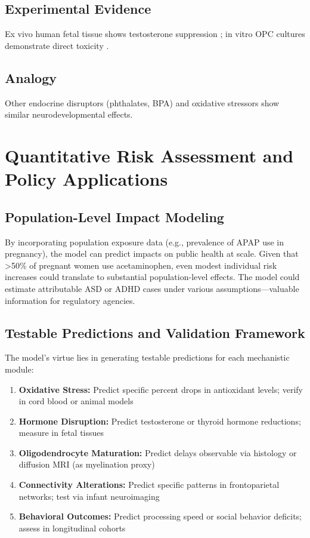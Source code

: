 \documentclass[11pt]{article}
\let\oldsection\section
\renewcommand{\section}[1]{\oldsection{#1}\setlength{\leftskip}{0em}}
\let\oldsubsection\subsection
\renewcommand{\subsection}[1]{\oldsubsection{#1}\setlength{\leftskip}{0.75em}}
\begin{document}
\subsection{Experimental Evidence}
Ex vivo human fetal tissue shows testosterone suppression \citep{kristensen2016}; in vitro OPC cultures demonstrate direct toxicity \citep{perez2012}.

\subsection{Analogy}
Other endocrine disruptors (phthalates, BPA) and oxidative stressors show similar neurodevelopmental effects.

\section{Quantitative Risk Assessment and Policy Applications}

\subsection{Population-Level Impact Modeling}
By incorporating population exposure data (e.g., prevalence of APAP use in pregnancy), the model can predict impacts on public health at scale. Given that >50\% of pregnant women use acetaminophen, even modest individual risk increases could translate to substantial population-level effects. The model could estimate attributable ASD or ADHD cases under various assumptions—valuable information for regulatory agencies.

\subsection{Testable Predictions and Validation Framework}
The model's virtue lies in generating testable predictions for each mechanistic module:
\begin{enumerate}
    \item \textbf{Oxidative Stress:} Predict specific percent drops in antioxidant levels; verify in cord blood or animal models
    \item \textbf{Hormone Disruption:} Predict testosterone or thyroid hormone reductions; measure in fetal tissues
    \item \textbf{Oligodendrocyte Maturation:} Predict delays observable via histology or diffusion MRI (as myelination proxy)
    \item \textbf{Connectivity Alterations:} Predict specific patterns in frontoparietal networks; test via infant neuroimaging
    \item \textbf{Behavioral Outcomes:} Predict processing speed or social behavior deficits; assess in longitudinal cohorts
\end{enumerate}
\end{document}
